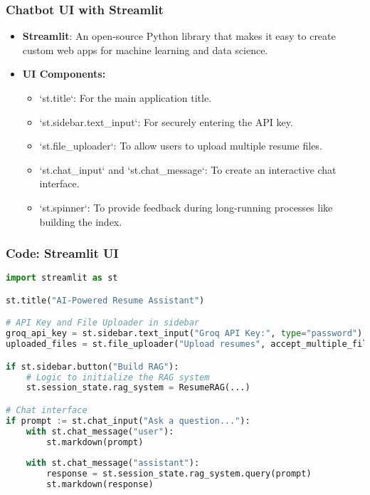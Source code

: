 \begin{frame}[fragile]\frametitle{Chatbot UI with Streamlit}
    \begin{itemize}
        \item \textbf{Streamlit}: An open-source Python library that makes it easy to create custom web apps for machine learning and data science.
        \item \textbf{UI Components:}
        \begin{itemize}
            \item `st.title`: For the main application title.
            \item `st.sidebar.text\_input`: For securely entering the API key.
            \item `st.file\_uploader`: To allow users to upload multiple resume files.
            \item `st.chat\_input` and `st.chat\_message`: To create an interactive chat interface.
            \item `st.spinner`: To provide feedback during long-running processes like building the index.
        \end{itemize}
    \end{itemize}
\end{frame}

\begin{frame}[fragile]\frametitle{Code: Streamlit UI}
    \begin{lstlisting}[language=Python, caption={streamlit\_main.py}]
import streamlit as st

st.title("AI-Powered Resume Assistant")

# API Key and File Uploader in sidebar
groq_api_key = st.sidebar.text_input("Groq API Key:", type="password")
uploaded_files = st.file_uploader("Upload resumes", accept_multiple_files=True)

if st.sidebar.button("Build RAG"):
    # Logic to initialize the RAG system
    st.session_state.rag_system = ResumeRAG(...)

# Chat interface
if prompt := st.chat_input("Ask a question..."):
    with st.chat_message("user"):
        st.markdown(prompt)
    
    with st.chat_message("assistant"):
        response = st.session_state.rag_system.query(prompt)
        st.markdown(response)
    \end{lstlisting}
\end{frame}

